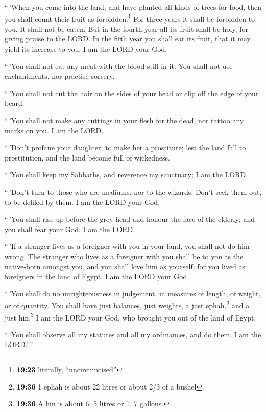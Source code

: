  ``\,'When you come into the land, and have planted all
kinds of trees for food, then you shall count their fruit as
forbidden.\footnote{\textbf{19:23} literally, ``uncircumcised''} For
three years it shall be forbidden to you. It shall not be eaten.
 But in the fourth year all its fruit shall be holy, for
giving praise to the LORD.  In the fifth year you shall
eat its fruit, that it may yield its increase to you. I am the LORD your
God.

 ``\,'You shall not eat any meat with the blood still in
it. You shall not use enchantments, nor practise sorcery.

 ``\,'You shall not cut the hair on the sides of your
head or clip off the edge of your beard.

 ``\,'You shall not make any cuttings in your flesh for
the dead, nor tattoo any marks on you. I am the LORD.

 ``\,'Don't profane your daughter, to make her a
prostitute; lest the land fall to prostitution, and the land become full
of wickedness.

 ``\,'You shall keep my Sabbaths, and reverence my
sanctuary; I am the LORD.

 ``\,'Don't turn to those who are mediums, nor to the
wizards. Don't seek them out, to be defiled by them. I am the LORD your
God.

 ``\,'You shall rise up before the grey head and honour
the face of the elderly; and you shall fear your God. I am the LORD.

 ``\,'If a stranger lives as a foreigner with you in your
land, you shall not do him wrong.  The stranger who lives
as a foreigner with you shall be to you as the native-born amongst you,
and you shall love him as yourself; for you lived as foreigners in the
land of Egypt. I am the LORD your God.

 ``\,'You shall do no unrighteousness in judgement, in
measures of length, of weight, or of quantity.  You shall
have just balances, just weights, a just ephah,\footnote{\textbf{19:36}
  1 ephah is about 22 litres or about 2/3 of a bushel} and a just
hin.\footnote{\textbf{19:36} A hin is about 6. 5 litres or 1. 7 gallons.}
I am the LORD your God, who brought you out of the land of Egypt.

 ``\,`You shall observe all my statutes and all my
ordinances, and do them. I am the LORD.'\,''

